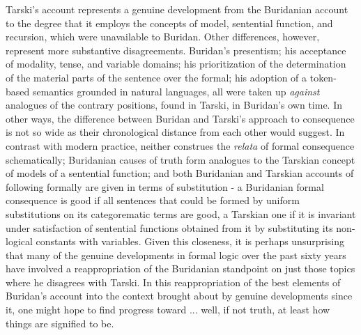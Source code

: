 \documentclass[]{article}
\begin{document}
Tarski's account represents a genuine development from the Buridanian account to the degree that it employs the concepts of model, sentential function, and recursion, which were unavailable to Buridan. Other differences, however, represent more substantive disagreements. Buridan's presentism; his acceptance of modality, tense, and variable domains; his prioritization of the determination of the material parts of the sentence over the formal; his adoption of a token-based semantics grounded in natural languages, all were taken up \textit{against} analogues of the contrary positions, found in Tarski, in Buridan's own time. In other ways, the difference between Buridan and Tarski's approach to consequence is not so wide as their chronological distance from each other would suggest. In contrast with modern practice, neither construes the \textit{relata} of formal consequence schematically; Buridanian causes of truth form analogues to the Tarskian concept of models of a sentential function; and both Buridanian and Tarskian accounts of following formally are given in terms of substitution - a Buridanian formal consequence is good if all sentences that could be formed by uniform substitutions on its categorematic terms are good, a Tarskian one if it is invariant under satisfaction of sentential functions obtained from it by substituting its non-logical constants with variables. Given this closeness, it is perhaps unsurprising that many of the genuine developments in formal logic over the past sixty years have involved a reappropriation of the Buridanian standpoint on just those topics where he disagrees with Tarski. In this reappropriation of the best elements of Buridan's account into the context brought about by genuine developments since it, one might hope to find progress toward ... well, if not truth, at least how things are signified to be.
\printbibliography
\end{document}
